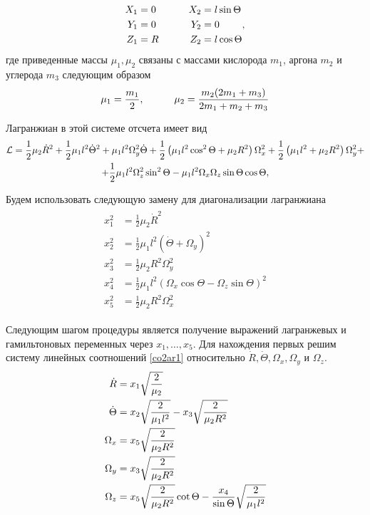 \documentclass[12pt]{article}
\newcommand{\lb}{\left(}
\newcommand{\rb}{\right)}
\newcommand{\mL}{\mathcal{L}}
\newcommand{\dR}{\dot{R}}
\newcommand{\dT}{\dot{\Theta}}
\begin{document}
\begin{gather}
	\begin{aligned}
		X_1 &= 0 \\
		Y_1 &= 0 \\
		Z_1 &= R
	\end{aligned}
	\quad \quad \quad
	\begin{aligned}
		X_2 &= l \sin \Theta \\
		Y_2 &= 0 \\
		Z_2 &= l \cos \Theta
	\end{aligned}, \notag
\end{gather}
где приведенные массы $\mu_1, \mu_2$ связаны с массами кислорода $m_1$, аргона $m_2$ и углерода $m_3$ следующим образом
\begin{gather}
	\mu_1 = \frac{m_1}{2}, \quad \quad \quad \mu_2 = \frac{m_2 (2 m_1 + m_3)}{2 m_1 + m_2 + m_3} \notag 
\end{gather}

Лагранжиан в этой системе отсчета имеет вид
\begin{gather}
		\mL = \frac{1}{2} \mu_2 \dR^2 + \frac{1}{2} \mu_1 l^2 \dT^2 + \mu_1 l^2 \Omega_y^2 \dT + \frac{1}{2} \lb \mu_1 l^2 \cos^2 \Theta + \mu_2 R^2 \rb \Omega_x^2 + \frac{1}{2} \lb \mu_1 l^2 + \mu_2 R^2 \rb \Omega_y^2 + \notag \\ 
	+ \frac{1}{2} \mu_1 l^2 \Omega_z^2 \sin^2 \Theta - \mu_1 l^2 \Omega_x \Omega_z \sin \Theta \cos \Theta, \notag
\end{gather}

Будем использовать следующую замену для диагонализации лагранжиана
\begin{gather}
	\begin{aligned}
			x_1^2 &= \frac{1}{2} \mu_2 \dR^2 \\
			x_2^2 &= \frac{1}{2} \mu_1 l^2 \lb \dT + \Omega_y \rb^2 \\
			x_3^2 &= \frac{1}{2} \mu_2 R^2 \Omega_y^2 \\
			x_4^2 &= \frac{1}{2} \mu_1 l^2 \lb \Omega_x \cos \Theta - \Omega_z \sin \Theta \rb^2 \\
			x_5^2 &= \frac{1}{2} \mu_2 R^2 \Omega_x^2
	\end{aligned} \label{co2ar1}
\end{gather}

Следующим шагом процедуры является получение выражений лагранжевых и гамильтоновых переменных через $x_1, \dots, x_5$. Для нахождения первых решим систему линейных соотношений \eqref{co2ar1} относительно $\dR, \dT, \Omega_x, \Omega_y$ и $\Omega_z$.   
\begin{gather}
	\begin{aligned}
			\dR &= x_1 \sqrt{\frac{2}{\mu_2}} \\
			\dT &= x_2 \sqrt{\frac{2}{\mu_1 l^2}} - x_3 \sqrt{\frac{2}{\mu_2 R^2}} \\
			\Omega_x &= x_5 \sqrt{\frac{2}{\mu_2 R^2}} \\
			\Omega_y &= x_3 \sqrt{\frac{2}{\mu_2 R^2}} \\
			\Omega_z &= x_5 \sqrt{\frac{2}{\mu_2 R^2}} \cot{\Theta} - \frac{x_4}{\sin \Theta} \sqrt{\frac{2}{\mu_1 l^2}} 
	\end{aligned} \notag
\end{gather}
\end{document}
